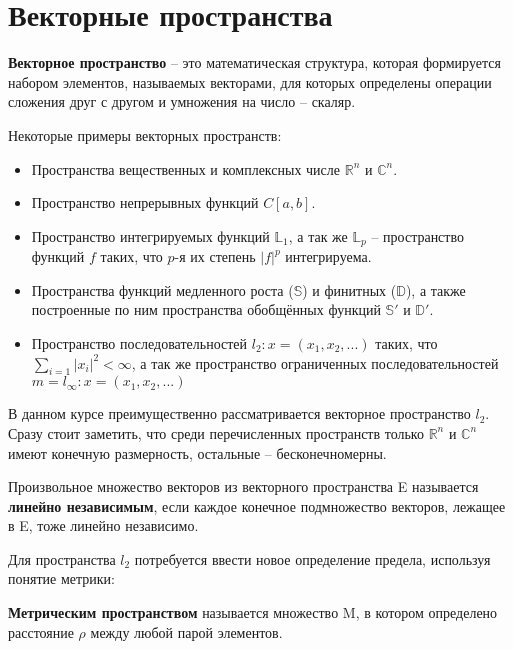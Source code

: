 	\section{Векторные пространства}
	
	\begin{defi} 
		\textbf{Векторное пространство} -- это математическая структура, которая формируется набором элементов, называемых векторами, для 
		которых определены операции сложения друг с другом и умножения на число -- скаляр.
	\end{defi}

	Некоторые примеры векторных пространств:
		\begin{itemize}
			\item Пространства вещественных и комплексных числе $\mathbb{R}^n$ и $\mathbb{C}^n$.
			\item Пространство непрерывных функций $C[a,b]$.
			\item Пространство интегрируемых функций $\mathbb{L}_1$, а так же $\mathbb{L}_p$ -- пространство функций $f$ таких, 
			что $p$-я их степень $|f|^p$ интегрируема.
			\item Пространства функций медленного роста ($\mathbb{S}$) и финитных ($\mathbb{D}$), а также построенные по ним пространства 
			обобщённых функций $\mathbb{S}'$ и $\mathbb{D}'$.
			\item Пространство последовательностей $l_2 : x = (x_1, x_2, ...)$ таких, что $\sum_{i=1} |x_i|^2 < \infty$, а так же 
			пространство ограниченных последовательностей $m = l_\infty : x = (x_1, x_2, ...)$
		\end{itemize}

	В данном курсе преимущественно рассматривается векторное пространство $l_2$. Сразу стоит заметить, что 
	среди перечисленных пространств только $\mathbb{R}^n$ и $\mathbb{C}^n$ имеют конечную размерность, остальные -- бесконечномерны.
	
	\begin{defi}
		Произвольное множество векторов из векторного пространства E называется \textbf{линейно независимым}, если каждое конечное
		подмножество векторов, лежащее в E, тоже линейно независимо.
	\end{defi}
	
	Для пространства $l_2$ потребуется ввести новое определение предела, используя понятие метрики:
	
	\begin{defi}
		\textbf{Метрическим пространством} называется множество M, в котором определено расстояние $\rho$ между любой парой элементов. 
	\end{defi}
	
